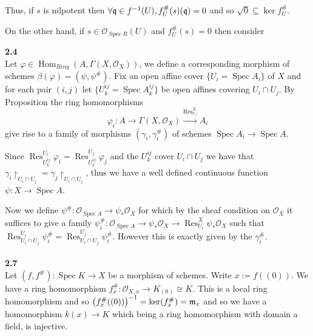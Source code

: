 \documentclass[12pt]{article}
\numberwithin{thm}{subsection}
\numberwithin{defn}{subsection}
\numberwithin{lemma}{subsection}
\numberwithin{example}{subsection}
\numberwithin{notation}{subsection}
\numberwithin{cor}{subsection}
\numberwithin{remark}{subsection}
\numberwithin{condition}{subsection}
\numberwithin{question}{subsection}
\numberwithin{construction}{subsection}
\numberwithin{construction}{subsection}
\numberwithin{construction}{subsection}
\newcommand{\call}[1]{\mathcal{#1}}
\newcommand{\lto}{\longrightarrow}
\begin{document}
\begin{enumerate}
    Thus, if $s$ is nilpotent then $\forall \frak{q} \in f^{-1}(U), f_U^{\#}(s)(\frak{q}) = 0$ and so $\sqrt{0} \subseteq \ker f_U^{\#}$.

    On the other hand, if $s \in \mathcal{O}_{\operatorname{Spec}R}(U)$ and $f^{\#}_U(s) = 0$ then consider 
    \end{enumerate}
\textbf{2.4}\\
Let $\varphi \in \operatorname{Hom}_{Ring}(A, \Gamma(X,\call{O}_X))$, we define a corresponding morphism of schemes $\beta(\varphi) = (\psi, \psi^{\#})$. Fix an open affine cover $\lbrace U_i = \operatorname{Spec}A_i\rbrace$ of $X$ and for each pair $(i,j)$ let $\lbrace U^{ij}_k = \operatorname{Spec}A^{ij}_k\rbrace$ be open affines covering $U_i \cap U_j$. By Proposition \cite[2.3]{hartshorne} the ring homomorphisms \[\varphi_i: A \lto \Gamma(X, \call{O}_X) \stackrel{\operatorname{Res}^X_{U_i}}{\lto} A_i\] give rise to a family of morphisms $(\gamma_i,\gamma^{\#}_i)$ of schemes $\operatorname{Spec}A_i \to \operatorname{Spec}A$.

Since $\operatorname{Res}^{U_i}_{U^{ij}_k}\varphi_i = \operatorname{Res}^{U_j}_{U^{ij}_k}\varphi_j$ and the $U_k^{ij}$ cover $U_i \cap U_j$ we have that $\gamma_i\restriction_{U_i \cap U_j} = \gamma_j\restriction_{U_i \cap U_j}$, thus we have a well defined continuous function $\psi: X \to \operatorname{Spec}A$.

Now we define $\psi^{\#}: \call{O}_{\operatorname{Spec}A} \to \psi_\ast\call{O}_{X}$ for which by the sheaf condition on $\call{O}_X$ it suffices to give a family $\psi^{\#}_i: \call{O}_{\operatorname{Spec}A} \to \psi_\ast\call{O}_X \to \operatorname{Res}^X_{U_i}\psi_\ast\call{O}_X$ such that $\operatorname{Res}^{U_i}_{U_i \cap U_j}\psi^{\#}_i = \operatorname{Res}^{U_j}_{U_i \cap U_j}\psi_i^{\#}$. However this is exactly given by the $\gamma_i^{\#}$.\\\\
%
\textbf{2.7}\\
Let $(f,f^{\#}): \operatorname{Spec}K \to X$ be a morphism of schemes. Write $x := f((0))$. We have a ring homomorphism $f^{\#}_x: \call{O}_{X,x}\lto  K_{(0)} \cong K$. This is a local ring homomorphism and so $\big(f^{\#}_x((0))\big)^{-1} = \operatorname{ker}(f^{\#}_x) = \frak{m}_x$ and so we have a homomorphism $k(x) \lto K$ which being a ring homomorphism with domain a field, is injective.
\end{document}
